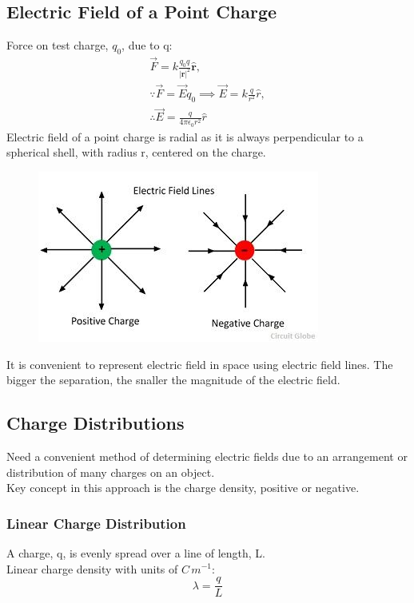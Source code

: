 \documentclass[a4paper, 11pt, fleqn, normalem]{report}
\begin{document}
\chapter{}
\section{Electric Field of a Point Charge}
Force on test charge, $q_{0}$, due to q:
\begin{gather*}
    \vec{F} = k\frac{q_{0}q}{|\mathbf{r}|^{2}} \mathbf{\hat{r}}, \\
    \because \vec{F} = \vec{E}q_{0} \implies \vec{E} = k\frac{q}{r^{2}}\hat{r}, \\ \therefore \vec{E} = \frac{q}{4\pi\epsilon_{0}r^{2}}\hat{r}
\end{gather*}
Electric field of a point charge is radial as it is always perpendicular to a spherical shell, with radius r, centered on the charge.

\begin{figure}[H]
    \includegraphics{electric-field-line.jpg}
\end{figure}

It is convenient to represent electric field in space using electric field lines. The bigger the separation, the snaller the magnitude of the electric field.

\section{Charge Distributions}
Need a convenient method of determining electric fields due to an arrangement or distribution of many charges on an object. \\
Key concept in this approach is the charge density, positive or negative.

\subsection{Linear Charge Distribution}
A charge, q, is evenly spread over a line of length, L. \\
Linear charge density with units of $C\,m^{-1}$:
\begin{equation*}
    \lambda = \frac{q}{L}
\end{equation*}
\end{document}

